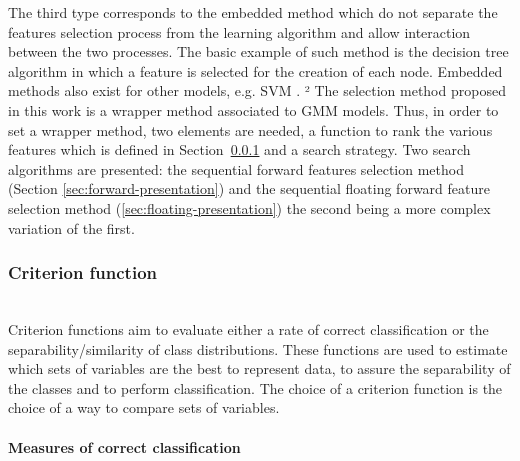 \documentclass[journal,peerreview,onecolumn]{IEEEtran}
\begin{document}
    The third type corresponds to the embedded method which do not separate the features selection process from the learning algorithm and allow interaction between the two processes. The basic example of such method is the decision tree algorithm in which a feature is selected for the creation of each node. Embedded methods also exist for other models, e.g. SVM \cite{guyon2002gene} \cite{weston2003use}.
²
    The selection method proposed in this work is a wrapper method associated to GMM models. Thus, in order to set a wrapper method, two elements are needed, a function to rank the various features which is defined in Section~\ref{sec:criterion} and a search strategy. Two search algorithms are presented: the sequential forward features selection method (Section \ref{sec:forward-presentation}) and the sequential floating forward feature selection method (\ref{sec:floating-presentation}) the second being a more complex variation of the first.

        \subsubsection{Criterion function}
        \label{sec:criterion}

        \hspace{0pt} \\

        Criterion functions aim to evaluate either a rate of correct classification or the separability/similarity of class distributions. These functions are used to estimate which sets of variables are the best to represent data, to assure the separability of the classes and to perform classification. The choice of a criterion function is the choice of a way to compare sets of variables.

            \paragraph{Measures of correct classification}
            \label{sec:criterion-rate}

            \hspace{0pt} \\
\end{document}
